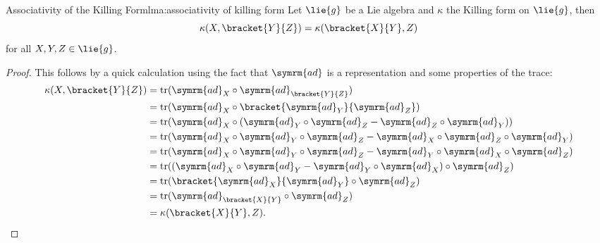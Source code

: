 \documentclass[fleqn]{NotesClass}
\DeclareMathOperator{\tr}{tr}
\newcommand{\ad}{\symrm{ad}}
\begin{document}
    \begin{lma}{Associativity of the Killing Form}{lma:associativity of killing form}
        Let \(\lie{g}\) be a Lie algebra and \(\kappa\) the Killing form on \(\lie{g}\), then
        \begin{equation}
            \kappa(X, \bracket{Y}{Z}) = \kappa(\bracket{X}{Y}, Z)
        \end{equation}
        for all \(X, Y, Z \in \lie{g}\).
        \begin{proof}
            This follows by a quick calculation using the fact that \(\ad\) is a representation and some properties of the trace:
            \begin{align}
                \kappa(X, \bracket{Y}{Z}) &= \tr(\ad_X \circ \ad_{\bracket{Y}{Z}})\\
                &= \tr(\ad_X \circ \bracket{\ad_Y}{\ad_Z})\\
                &= \tr(\ad_X \circ (\ad_Y \circ \ad_Z - \ad_Z \circ \ad_Y))\\
                &= \tr(\ad_X \circ \ad_Y \circ \ad_Z - \ad_X \circ \ad_Z \circ \ad_Y)\\
                &= \tr(\ad_X \circ \ad_Y \circ \ad_Z - \ad_Y \circ \ad_X \circ \ad_Z)\\
                &= \tr((\ad_X \circ \ad_Y - \ad_Y \circ \ad_X) \circ \ad_Z)\\
                &= \tr(\bracket{\ad_X}{\ad_Y} \circ \ad_Z)\\
                &= \tr(\ad_{\bracket{X}{Y}} \circ \ad_Z)\\
                &= \kappa(\bracket{X}{Y}, Z). \qedhere
            \end{align}
        \end{proof}
    \end{lma}
    
\end{document}
